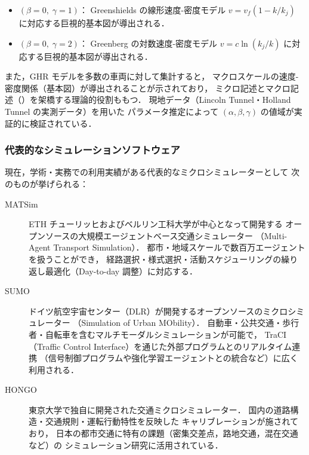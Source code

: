 \begin{itemize}
  \item $(\beta = 0,\; \gamma = 1)$：
    Greenshields の線形速度-密度モデル $v = v_f(1 - k/k_j)$ に対応する巨視的基本図が導出される．
  \item $(\beta = 0,\; \gamma = 2)$：
    Greenberg の対数速度-密度モデル $v = c \ln(k_j/k)$ に対応する巨視的基本図が導出される．
\end{itemize}

また，GHR モデルを多数の車両に対して集計すると，
マクロスケールの速度-密度関係（基本図）が導出されることが示されており\cite{Gazis1961}，
ミクロ記述とマクロ記述（）を架橋する理論的役割ももつ．
現地データ（Lincoln Tunnel・Holland Tunnel の実測データ）を用いた
パラメータ推定によって $(\alpha, \beta, \gamma)$ の値域が実証的に検証されている\cite{Gazis1961}．

\subsubsection*{代表的なシミュレーションソフトウェア}

現在，学術・実務での利用実績がある代表的なミクロシミュレーターとして
次のものが挙げられる：

\begin{description}
  \item[MATSim]
    ETH チューリッヒおよびベルリン工科大学が中心となって開発する
    オープンソースの大規模エージェントベース交通シミュレーター
    （Multi-Agent Transport Simulation）．
    都市・地域スケールで数百万エージェントを扱うことができ，
    経路選択・様式選択・活動スケジューリングの繰り返し最適化（Day-to-day 調整）に対応する．

  \item[SUMO]
    ドイツ航空宇宙センター（DLR）が開発するオープンソースのミクロシミュレーター
    （Simulation of Urban MObility）．
    自動車・公共交通・歩行者・自転車を含むマルチモーダルシミュレーションが可能で，
    TraCI（Traffic Control Interface）を通じた外部プログラムとのリアルタイム連携
    （信号制御プログラムや強化学習エージェントとの統合など）に広く利用される．

  \item[HONGO]
    東京大学で独自に開発された交通ミクロシミュレーター．
    国内の道路構造・交通規則・運転行動特性を反映した
    キャリブレーションが施されており，
    日本の都市交通に特有の課題（密集交差点，路地交通，混在交通など）の
    シミュレーション研究に活用されている．
\end{description}


